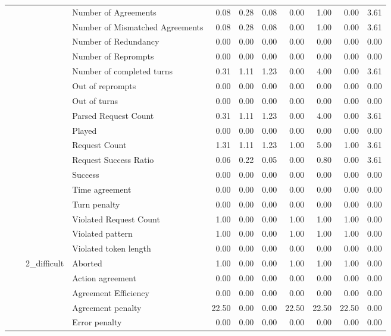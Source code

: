 \begin{tabular}{llllrrrrrrr}
 &  &  & Number of Agreements & 0.08 & 0.28 & 0.08 & 0.00 & 1.00 & 0.00 & 3.61 \\
 &  &  & Number of Mismatched Agreements & 0.08 & 0.28 & 0.08 & 0.00 & 1.00 & 0.00 & 3.61 \\
 &  &  & Number of Redundancy & 0.00 & 0.00 & 0.00 & 0.00 & 0.00 & 0.00 & 0.00 \\
 &  &  & Number of Reprompts & 0.00 & 0.00 & 0.00 & 0.00 & 0.00 & 0.00 & 0.00 \\
 &  &  & Number of completed turns & 0.31 & 1.11 & 1.23 & 0.00 & 4.00 & 0.00 & 3.61 \\
 &  &  & Out of reprompts & 0.00 & 0.00 & 0.00 & 0.00 & 0.00 & 0.00 & 0.00 \\
 &  &  & Out of turns & 0.00 & 0.00 & 0.00 & 0.00 & 0.00 & 0.00 & 0.00 \\
 &  &  & Parsed Request Count & 0.31 & 1.11 & 1.23 & 0.00 & 4.00 & 0.00 & 3.61 \\
 &  &  & Played & 0.00 & 0.00 & 0.00 & 0.00 & 0.00 & 0.00 & 0.00 \\
 &  &  & Request Count & 1.31 & 1.11 & 1.23 & 1.00 & 5.00 & 1.00 & 3.61 \\
 &  &  & Request Success Ratio & 0.06 & 0.22 & 0.05 & 0.00 & 0.80 & 0.00 & 3.61 \\
 &  &  & Success & 0.00 & 0.00 & 0.00 & 0.00 & 0.00 & 0.00 & 0.00 \\
 &  &  & Time agreement & 0.00 & 0.00 & 0.00 & 0.00 & 0.00 & 0.00 & 0.00 \\
 &  &  & Turn penalty & 0.00 & 0.00 & 0.00 & 0.00 & 0.00 & 0.00 & 0.00 \\
 &  &  & Violated Request Count & 1.00 & 0.00 & 0.00 & 1.00 & 1.00 & 1.00 & 0.00 \\
 &  &  & Violated pattern & 1.00 & 0.00 & 0.00 & 1.00 & 1.00 & 1.00 & 0.00 \\
 &  &  & Violated token length & 0.00 & 0.00 & 0.00 & 0.00 & 0.00 & 0.00 & 0.00 \\
\cline{3-11}
 &  & \multirow[t]{27}{*}{2_difficult} & Aborted & 1.00 & 0.00 & 0.00 & 1.00 & 1.00 & 1.00 & 0.00 \\
 &  &  & Action agreement & 0.00 & 0.00 & 0.00 & 0.00 & 0.00 & 0.00 & 0.00 \\
 &  &  & Agreement Efficiency & 0.00 & 0.00 & 0.00 & 0.00 & 0.00 & 0.00 & 0.00 \\
 &  &  & Agreement penalty & 22.50 & 0.00 & 0.00 & 22.50 & 22.50 & 22.50 & 0.00 \\
 &  &  & Error penalty & 0.00 & 0.00 & 0.00 & 0.00 & 0.00 & 0.00 & 0.00 \\

\end{tabular}
